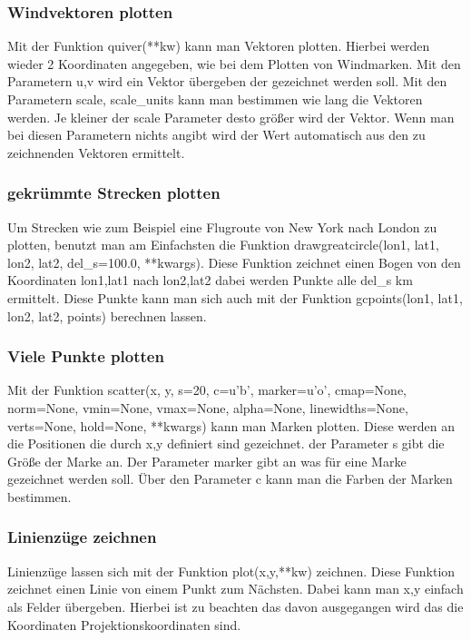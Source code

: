 \subsubsection{Windvektoren plotten}
  Mit der Funktion \textsf{quiver(**kw)} kann man Vektoren plotten. Hierbei werden wieder 2 Koordinaten angegeben, wie bei dem Plotten von Windmarken. Mit den Parametern \textsf{u,v} wird ein Vektor übergeben der gezeichnet werden soll. Mit den Parametern \textsf{scale, scale\_units} kann man bestimmen wie lang die Vektoren werden. Je kleiner der \textsf{scale} Parameter desto größer wird der Vektor. Wenn man bei diesen Parametern nichts angibt wird der Wert automatisch aus den zu zeichnenden Vektoren ermittelt.\\
  \subsubsection{gekrümmte Strecken plotten}
  Um Strecken wie zum Beispiel eine Flugroute von New York nach London zu plotten, benutzt man am Einfachsten die Funktion \textsf{drawgreatcircle(lon1, lat1, lon2, lat2, del\_s=100.0, **kwargs)}. Diese Funktion zeichnet einen Bogen von den Koordinaten \textsf{lon1,lat1} nach \textsf{lon2,lat2} dabei werden Punkte alle \textsf{del\_s} km ermittelt. Diese Punkte kann man sich auch mit der Funktion \textsf{gcpoints(lon1, lat1, lon2, lat2, points)} berechnen lassen.\\
  \subsubsection{Viele Punkte plotten}
  Mit der Funktion \textsf{scatter(x, y, s=20, c=u'b', marker=u'o', cmap=None, norm=None, vmin=None, vmax=None, alpha=None, linewidths=None, verts=None, hold=None, **kwargs)} kann man Marken plotten. Diese werden an die Positionen die durch \textsf{x,y} definiert sind gezeichnet. der Parameter \textsf{s} gibt die Größe der Marke an. Der Parameter \textsf{marker} gibt an was für eine Marke gezeichnet werden soll. Über den Parameter \textsf{c} kann man die Farben der Marken bestimmen.
   \subsubsection{Linienzüge zeichnen}
   Linienzüge lassen sich mit der Funktion \textsf{plot(x,y,**kw)} zeichnen. Diese Funktion zeichnet einen Linie von einem Punkt zum Nächsten. Dabei kann man \textsf{x,y} einfach als Felder übergeben. Hierbei ist zu beachten das davon ausgegangen wird das die Koordinaten Projektionskoordinaten sind.